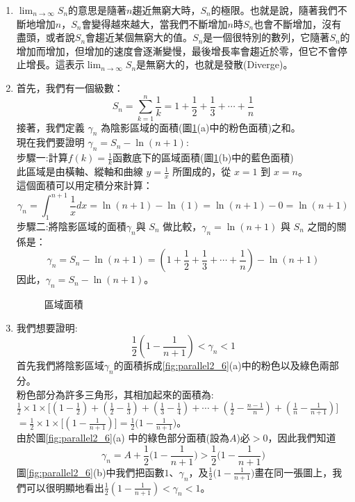 \documentclass[12pt, a4paper]{article}
\begin{document}
\begin{enumerate}
\item $\lim_{n\rightarrow \infty} S_n$\;的意思是隨著\;$n$\;趨近無窮大時，\;$S_n$\;的極限。也就是說，隨著我們不斷地增加\;$n$\;，\;$S_n$\;會變得越來越大，當我們不斷增加\;$n$\;時\;$S_n$\;也會不斷增加，沒有盡頭，或者說\;$S_n$\;會趨近某個無窮大的值。\;$S_n$\;是一個很特別的數列，它隨著\;$S_n$\;的增加而增加，但增加的速度會逐漸變慢，最後增長率會趨近於零，但它不會停止增長。這表示\;$\lim_{n\rightarrow \infty} S_n$\;是無窮大的，也就是發散(Diverge)。

\item 首先，我們有一個級數：$$S_n = \sum_{k=1}^{n} \frac{1}{k} = 1 + \frac{1}{2} + \frac{1}{3} + \cdots + \frac{1}{n}$$
接著，我們定義 $\gamma_n$ 為陰影區域的面積(圖\;\ref{fig:parallel2_5}\;(a)\;中的粉色面積)之和。\\
現在我們要證明 $\gamma_n = S_n - \ln(n+1)$\;:\\
步驟一\;:\;計算\;$f(k)=\frac{1}{k}$\;函數底下的區域面積(圖\;\ref{fig:parallel2_5}\;(b)\;中的藍色面積)\\
此區域是由橫軸、縱軸和曲線 $y = \frac{1}{x}$ 所圍成的，從 $x = 1$ 到 $x = n$。\\
這個面積可以用定積分來計算：$$\gamma_n = \int_{1}^{n+1} \frac{1}{x} dx = \ln(n+1) - \ln(1) = \ln(n+1) - 0 = \ln(n+1)$$
步驟二\;:\;將陰影區域的面積\;$\gamma_n$\;與 $S_n$ 做比較，$\gamma_n = \ln(n+1)$ 與 $S_n$ 之間的關係是：$$\gamma_n = S_n - \ln(n+1) = \left(1 + \frac{1}{2} + \frac{1}{3} + \cdots + \frac{1}{n}\right) - \ln(n+1)$$
因此，$\gamma_n =S_n - \ln(n+1)$。

\begin{figure}[H]
\centering
{}
\caption{區域面積}
\label{fig:parallel2_5}
\end{figure}

\item 我們想要證明:$$ \frac{1}{2}(1-\frac{1}{n+1})<\gamma_n < 1$$
首先我們將陰影區域\;$\gamma_n$\;的面積拆成\;\ref{fig:parallel2_6}\;(a)\;中的粉色以及綠色兩部分。\\
粉色部分為許多三角形，其相加起來的面積為\;:\\
\;$\frac{1}{2} \times 1 \times \big[(1- \frac{1}{2})+(\frac{1}{2}- \frac{1}{3})+(\frac{1}{3}- \frac{1}{4})+ \cdots +(\frac{1}{2}- \frac{n-1}{n})+(\frac{1}{n}- \frac{1}{n+1})\big]$\\
$=\frac{1}{2} \times 1 \times \big[(1- \frac{1}{n+1})\big]=\frac{1}{2} \big(1-\frac{1}{n+1}\big)$\;。\\
由於圖\;\ref{fig:parallel2_6}\;(a)\;
中的綠色部分面積(設為\;$A$\;)必\;$>0$\;，因此我們知道$$\gamma_n=A+\frac{1}{2} \big(1-\frac{1}{n+1}\big)>\frac{1}{2} \big(1-\frac{1}{n+1}\big)$$
圖\;\ref{fig:parallel2_6}\;(b)\;中我們把函數\;$1$\;、\;$\gamma_n$\;，及\;$\frac{1}{2} \big(1-\frac{1}{n+1}\big)$\;畫在同一張圖上，我們可以很明顯地看出\;$ \frac{1}{2}(1-\frac{1}{n+1})<\gamma_n < 1$\;。


\end{enumerate}
\end{document}
